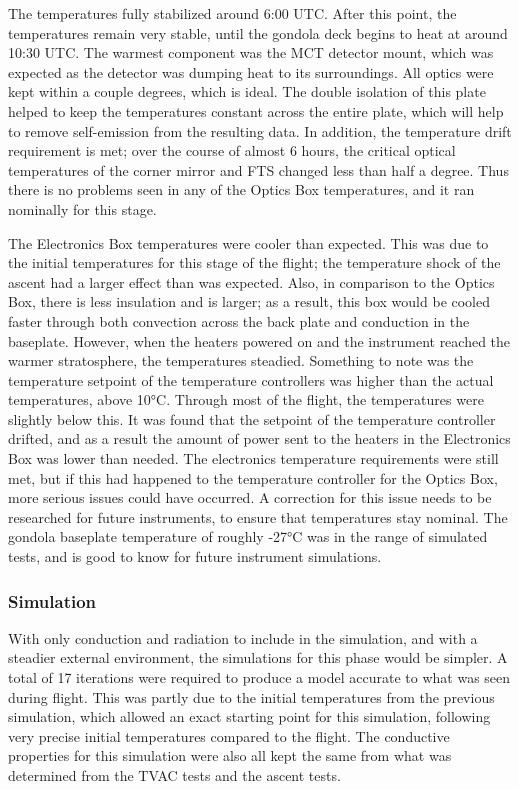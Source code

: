 The temperatures fully stabilized around 6:00 UTC. After this point, the temperatures remain very stable, until the gondola deck begins to heat at around 10:30 UTC. The warmest component was the MCT detector mount, which was expected as the detector was dumping heat to its surroundings. All optics were kept within a couple degrees, which is ideal. The double isolation of this plate helped to keep the temperatures constant across the entire plate, which will help to remove self-emission from the resulting data. In addition, the temperature drift requirement is met; over the course of almost 6 hours, the critical optical temperatures of the corner mirror and FTS changed less than half a degree. Thus there is no problems seen in any of the Optics Box temperatures, and it ran nominally for this stage.

The Electronics Box temperatures were cooler than expected. This was due to the initial temperatures for this stage of the flight; the temperature shock of the ascent had a larger effect than was expected. Also, in comparison to the Optics Box, there is less insulation and is larger; as a result, this box would be cooled faster through both convection across the back plate and conduction in the baseplate. However, when the heaters powered on and the instrument reached the warmer stratosphere, the temperatures steadied. Something to note was the temperature setpoint of the temperature controllers was higher than the actual temperatures, above 10°C. Through most of the flight, the temperatures were slightly below this. It was found that the setpoint of the temperature controller drifted, and as a result the amount of power sent to the heaters in the Electronics Box was lower than needed. The electronics temperature requirements were still met, but if this had happened to the temperature controller for the Optics Box, more serious issues could have occurred. A correction for this issue needs to be researched for future instruments, to ensure that temperatures stay nominal. The gondola baseplate temperature of roughly -27°C was in the range of simulated tests, and is good to know for future instrument simulations.

\subsubsection{Simulation}
With only conduction and radiation to include in the simulation, and with a steadier external environment, the simulations for this phase would be simpler. A total of 17 iterations were required to produce a model accurate to what was seen during flight. This was partly due to the initial temperatures from the previous simulation, which allowed an exact starting point for this simulation, following very precise initial temperatures compared to the flight. The conductive properties for this simulation were also all kept the same from what was determined from the TVAC tests and the ascent tests.

